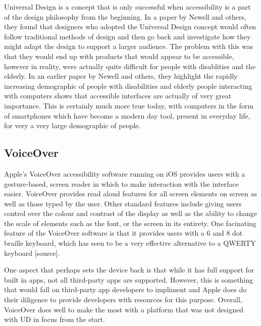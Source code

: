 Universal Design is a concept that is only successful when accessibility is a part of the design philosophy from the beginning\cite{incldesign}.
In a paper by Newell and others\cite{incldesign}, they found that designers who adopted the Universal Design concept would often follow traditional methods of design and then go back and investigate how they might adapt the design to support a larger audience.
The problem with this was that they would end up with products that would appear to be accessible, however in reality, were actually quite difficult for people with disablities and the elderly.
In an earlier paper by Newell and others, they highlight the rapidly increasing demographic of people with disabilities and elderly people interacting with computers shows that accessible interfaces are actually of very great importance\cite{computerinterface}.
This is certainly much more true today, with computers in the form of smartphones which have become a modern day tool, present in everyday life, for very a very large demographic of people.


\subsection{VoiceOver}
Apple's VoiceOver accessibility software running on iOS provides users with a gesture-based, screen reader in which to make interaction with the interface easier\cite{iphone}.
VoiceOver provides read aloud features for all screen elements on screen as well as those typed by the user.
Other standard features include giving users control over the colour and contrast of the display as well as the ability to change the scale of elements such as the font, or the screen in its entirety.
One facinating feature of the VoiceOver software is that it provides users with a 6 and 8 dot braille keyboard, which has seen to be a very effective alternative to a QWERTY keyboard [source]. %

One aspect that perhaps sets the device back is that while it has full support for built in apps, not all third-party apps are supported.
However, this is something that would fall on third-party app developers to impliment and Apple does do their diligence to provide developers with resources for this purpose\cite{iphonedev}.
Overall, VoiceOver does well to make the most with a platform that was not designed with UD in focus from the start.

